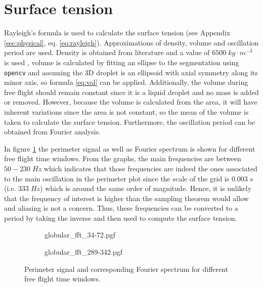 \section{Surface tension}

Rayleigh's formula \cite{rayleigh} is used to calculate the surface tension (see Appendix \ref{sec:physical}, eq. \eqref{eq:rayleigh}). Approximations of density, volume and oscillation period are used. Density is obtained from literature and a value of $6500\;kg\cdot m^{-3}$ is used \cite{surface_tension}, volume is calculated by fitting an ellipse to the segmentation using \texttt{opencv} and assuming the 3D droplet is an ellipsoid with axial symmetry along its minor axis, so formula \eqref{eq:vol} can be applied. Additionally, the volume during free flight should remain constant since it is a liquid droplet and no mass is added or removed. However, because the volume is calculated from the area, it will have inherent variations since the area is not constant, so the mean of the volume is taken to calculate the surface tension. Furthermore, the oscillation period can be obtained from Fourier analysis. 

In figure \ref{fig:fft} the perimeter signal as well as Fourier spectrum is shown for different free flight time windows. From the graphs, the main frequencies are between $50-230\;Hz$ which indicates that those frequencies are indeed the ones associated to the main oscillation in the perimeter plot since the scale of the grid is $0.003\;s$ (i.e. $333\;Hz$) which is around the same order of magnitude. Hence, it is unlikely that the frequency of interest is higher than the sampling theorem would allow and aliasing is not a concern. Thus, these frequencies can be converted to a period by taking the inverse and then used to compute the surface tension.

\begin{figure}
\centering
  \begin{subfigure}[b]{\textwidth}
    {globular_fft_34-72.pgf}
  \end{subfigure}
\vfill
  \begin{subfigure}[b]{\textwidth}
    {globular_fft_289-342.pgf}
  \end{subfigure}
\caption[Perimeter signal and corresponding Fourier spectrum for different free flight time windows]{Perimeter signal and corresponding Fourier spectrum for different free flight time windows.} 
\label{fig:fft}
\end{figure}

